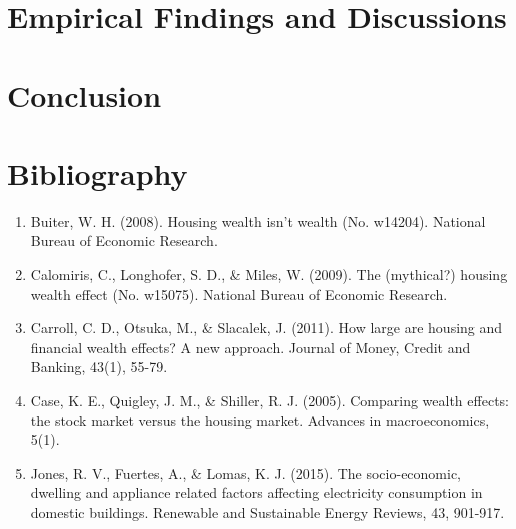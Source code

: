 \documentclass[12pt]{article}
\begin{document}
\section{Empirical Findings and Discussions}

\section{Conclusion}

\section{Bibliography}
\begin{enumerate}

\item Buiter, W. H. (2008). Housing wealth isn't wealth (No. w14204). National Bureau of Economic Research.

\item Calomiris, C., Longhofer, S. D., & Miles, W. (2009). The (mythical?) housing wealth effect (No. w15075). National Bureau of Economic Research.

\item Carroll, C. D., Otsuka, M., & Slacalek, J. (2011). How large are housing and financial wealth effects? A new approach. Journal of Money, Credit and Banking, 43(1), 55-79.

\item Case, K. E., Quigley, J. M., & Shiller, R. J. (2005). Comparing wealth effects: the stock market versus the housing market. Advances in macroeconomics, 5(1).

\item Jones, R. V., Fuertes, A., & Lomas, K. J. (2015). The socio-economic, dwelling and appliance related factors affecting electricity consumption in domestic buildings. Renewable and Sustainable Energy Reviews, 43, 901-917.


\end{enumerate}
\end{document}
